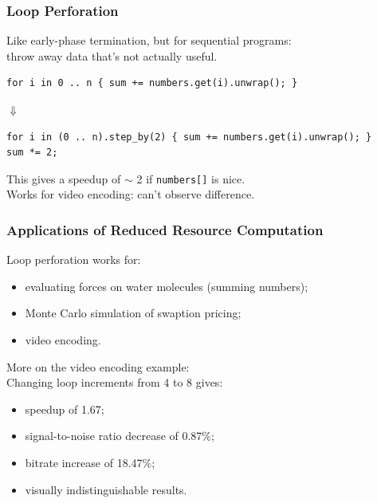 
\begin{frame}[fragile]
  \frametitle{Loop Perforation}


  Like early-phase termination, but for sequential programs:\\
  \qquad throw away data that's not actually useful.

  \begin{lstlisting}
for i in 0 .. n { sum += numbers.get(i).unwrap(); }
  \end{lstlisting}

  \begin{center}
    $\Downarrow$
  \end{center}

  \begin{lstlisting}
for i in (0 .. n).step_by(2) { sum += numbers.get(i).unwrap(); }
sum *= 2;
  \end{lstlisting}

  This gives a speedup of $\sim$ 2 if {\tt numbers[]} is nice.\\[1em]

  Works for video encoding: can't observe difference.



\end{frame}

\begin{frame}
  \frametitle{Applications of Reduced Resource Computation}


  Loop perforation works for:
  \begin{itemize}
   \item evaluating forces on water molecules (summing numbers);
   \item Monte Carlo simulation of swaption pricing;
   \item video encoding.
  \end{itemize}

  More on the video encoding example:\\
  Changing loop increments from 4 to 8 gives:
\begin{itemize}
 \item speedup of 1.67;
 \item signal-to-noise ratio decrease of 0.87\%;
 \item bitrate increase of 18.47\%;
 \item visually indistinguishable results.
\end{itemize}

\end{frame}





